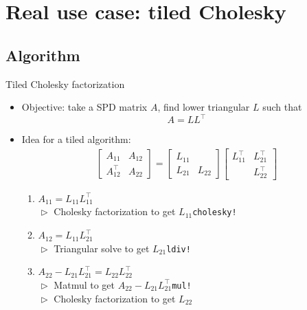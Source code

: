 \documentclass{beamer}
\begin{document}




\section{Real use case: tiled Cholesky}

\subsection{Algorithm}

\begin{frame}{Tiled Cholesky factorization}
  \begin{itemize}
  \item Objective: take a SPD matrix $A$, find lower triangular $L$ such
    that \[A=LL^\top\]
  \item Idea for a tiled algorithm:
    \begin{align*}
      \begin{bmatrix}
        A_{11} & A_{12} \\
        A_{12}^\top & A_{22}
      \end{bmatrix} = \begin{bmatrix}
        L_{11} & \\
        L_{21} & L_{22}
      \end{bmatrix}
                 \begin{bmatrix}
                   L^\top_{11} & L^\top_{21} \\
                   & L^\top_{22}
                 \end{bmatrix}
    \end{align*}
    \vspace{-10pt}
    \begin{enumerate}
    \item<2-> $A_{11} = L_{11} L^\top_{11}$\\
      $\vartriangleright$ Cholesky factorization to get $L_{11}$\hfill\texttt{cholesky!}\medskip
    \item<3-> $A_{12} = L_{11} L^\top_{21}$\\
      $\vartriangleright$ Triangular solve to get $L_{21}$\hfill\texttt{ldiv!}\medskip
    \item<4-> $A_{22} - L_{21} L^\top_{21} = L_{22} L^\top_{22}$\\
      $\vartriangleright$ Matmul to get $A_{22} - L_{21} L^\top_{21}$\hfill\texttt{mul!}\\
      $\vartriangleright$ Cholesky factorization to get $L_{22}$
    \end{enumerate}
  \end{itemize}
\end{frame}
\end{document}
